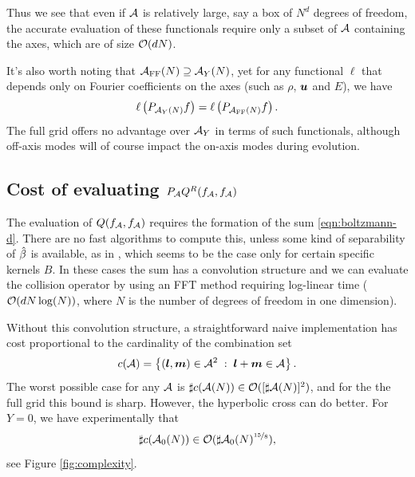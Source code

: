 Thus we see that even if $\mathcal{A}$ is relatively large, say a box of $N^d$ degrees
of freedom, the accurate evaluation of these functionals require only a subset
of $\mathcal{A}$ containing the axes, which are of size $\mathcal{O}(dN)$.

It's also worth noting that $\mathcal{A}_\text{FF}(N) \supseteq \mathcal{A}_Y(N)$, yet for any functional
$\ell$ that depends only on Fourier coefficients on the axes (such as $\rho$,
${\bm u}$ and $E$), we have
\[
    \ell\left(P_{\mathcal{A}_Y(N)}f\right) = \ell\left(P_{\mathcal{A}_\text{FF}(N)}f\right).
\]
The full grid offers no advantage over $\mathcal{A}_Y$ in terms of such functionals, although off-axis modes will of
course impact the on-axis modes during evolution.

\subsection{Cost of evaluating $P_{\mathcal{A}} Q^R(f_{\mathcal{A}},f_{\mathcal{A}})$}

The evaluation of $Q(f_{\mathcal{A}},f_{\mathcal{A}})$ requires the formation of the sum \eqref{eqn:boltzmann-d}. There are no
fast algorithms to compute this, unless some kind of separability of $\hat{\beta}$ is available, as in
\cite{Mouhot06}, which seems to be the case only for certain specific kernels $B$. In these cases the sum has
a convolution structure and we can evaluate the collision operator by using an FFT method requiring log-linear
time ($\mathcal{O}(dN\log(N))$, where $N$ is the number of degrees of freedom in one dimension).

Without this convolution structure, a straightforward naive implementation has cost proportional to the
cardinality of the combination set
\[
    c(\mathcal{A}) = \left\{ ({\bm l},{\bm m})\in\mathcal{A}^2 \;:\; {\bm l}+{\bm m}\in\mathcal{A} \right\}.
\]
The worst possible case for any $\mathcal{A}$ is $\sharp c(\mathcal{A}(N)) \in \mathcal{O}([\sharp \mathcal{A}(N)]^2)$, and for the the full grid
this bound is sharp. However, the hyperbolic cross can do better. For $Y=0$, we have experimentally that
\[
    \sharp c(\mathcal{A}_0(N)) \in \mathcal{O}(\sharp\mathcal{A}_0(N)^{\nicefrac{15}{8}}),
\]
see Figure \ref{fig:complexity}.

